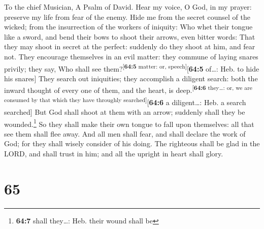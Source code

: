 To the chief Musician, A Psalm of David.  Hear my voice, O
God, in my prayer: preserve my life from fear of the enemy.
 Hide me from the secret counsel of the wicked; from the
insurrection of the workers of iniquity:  Who whet their
tongue like a sword, and bend their bows to shoot their arrows, even
bitter words:  That they may shoot in secret at the
perfect: suddenly do they shoot at him, and fear not. 
They encourage themselves in an evil matter: they commune of laying
snares privily; they say, Who shall see
them?\textsuperscript{{[}\textbf{64:5} matter: or,
speech{]}}{[}\textbf{64:5} of\ldots: Heb. to hide his snares{]}
 They search out iniquities; they accomplish a diligent
search: both the inward thought of every one of them, and the heart, is
deep.\textsuperscript{{[}\textbf{64:6} they\ldots: or, we are consumed
by that which they have throughly searched{]}}{[}\textbf{64:6} a
diligent\ldots: Heb. a search searched{]}  But God shall
shoot at them with an arrow; suddenly shall they be wounded.\footnote{\textbf{64:7}
  shall they\ldots: Heb. their wound shall be}  So they
shall make their own tongue to fall upon themselves: all that see them
shall flee away.  And all men shall fear, and shall
declare the work of God; for they shall wisely consider of his doing.
 The righteous shall be glad in the LORD, and shall trust
in him; and all the upright in heart shall glory.

\hypertarget{section-64}{%
\section{65}\label{section-64}}

